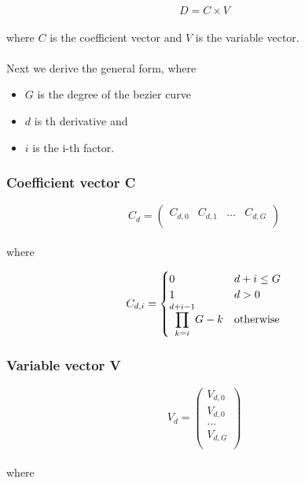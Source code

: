 \begin{equation*}
    D=C \times V
\end{equation*}
\\
where $C$ is the coefficient vector and $V$ is the variable vector.\\
\\
Next we derive the general form, where

\begin{itemize}
    \item $G$ is the degree of the bezier curve
    \item $d$ is th derivative and
    \item $i$ is the i-th factor.
\end{itemize}

\subsubsection{Coefficient vector C}

\begin{equation*}
    C_{d}=
    \left(
    \begin{array}{cccc}
            C_{d,0} & C_{d,1} & ... & C_{d,G} \\
        \end{array}
    \right)
\end{equation*}
\\
where

\begin{equation*}
    C_{d,i}=
    \begin{cases}
        0                                            & d + i \leq G     \\
        1                                            & d>0              \\
        \mathlarger{\prod}_{k = i}^{d + i - 1} G - k & \text{otherwise}
    \end{cases}
\end{equation*}

\subsubsection{Variable vector V}

\begin{equation*}
    V_{d}=
    \left(
    \begin{array}{cccc}
            V_{d,0} \\
            V_{d,0} \\
            ...     \\
            V_{d,G} \\
        \end{array}
    \right)
\end{equation*}
\\
where

